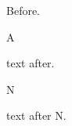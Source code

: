 \documentclass{article}
\begin{document}
Before.

\parbox{3cm}{A} text after.

\noindent\parbox{3cm}{N} text after N.
\end{document}

